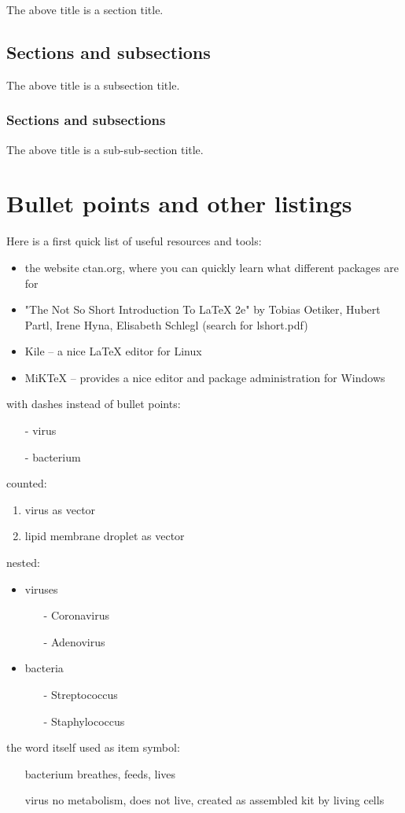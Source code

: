 \documentclass[11pt,a4paper,twoside,titlepage]{book}
\begin{document}
The above title is a section title.

\subsection{Sections and subsections}

The above title is a subsection title.

\subsubsection{Sections and subsections}

The above title is a sub-sub-section title.

\section{Bullet points and other listings}

Here is a first quick list of useful resources and tools:
\begin{itemize}
\item the website ctan.org, where you can quickly learn what different packages are for
\item "The Not So Short Introduction To LaTeX 2e" by Tobias Oetiker, Hubert Partl, Irene Hyna, Elisabeth Schlegl (search for lshort.pdf)
\item Kile -- a nice LaTeX editor for Linux
\item MiKTeX -- provides a nice editor and package administration for Windows
\end{itemize}


with dashes instead of bullet points:
\begin{itemize}
\item[-] virus
\item[-] bacterium
\end{itemize}

counted:
\begin{enumerate}
\item virus as vector
\item lipid membrane droplet as vector
\end{enumerate}

nested:
\begin{itemize}
\item viruses
\begin{itemize}
\item[-] Coronavirus
\item[-] Adenovirus
\end{itemize}
\item bacteria
\begin{itemize}
\item[-] Streptococcus
\item[-] Staphylococcus
\end{itemize}
\end{itemize}

the word itself used as item symbol:
\begin{itemize}
\item[bacterium] breathes, feeds, lives
\item[virus] no metabolism, does not live, created as assembled kit by living cells
\end{itemize}
\end{document}
